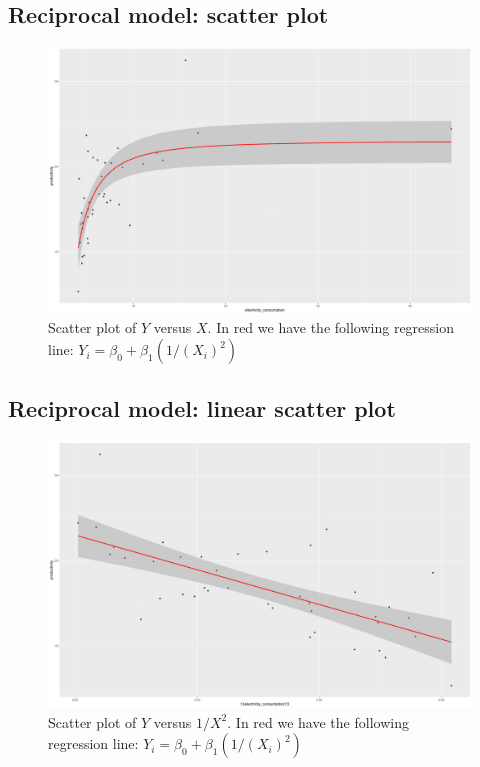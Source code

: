 \subsection{Reciprocal model: scatter plot}

\begin{figure}[H]
  \centering
  \includegraphics[width=\textwidth]{figures/png/reciprocal_scatter_plot.png}
  \caption{Scatter plot of $Y$ versus $X$. In red we have the following regression line: $Y_i = \beta_0 + \beta_1 (1/(X_i)^2)$}
  \label{fig:scatter-plot-reciprocal-model}
\end{figure}

\subsection{Reciprocal model: linear scatter plot}

\begin{figure}[H]
  \centering
  \includegraphics[width=\textwidth]{figures/png/reciprocal_linear_scatter_plot.png}
  \caption{Scatter plot of $Y$ versus $1/X^2$. In red we have the following regression line: $Y_i = \beta_0 + \beta_1 (1/(X_i)^2)$}
  \label{fig:linear-scatter-plot-reciprocal-model}
\end{figure}

